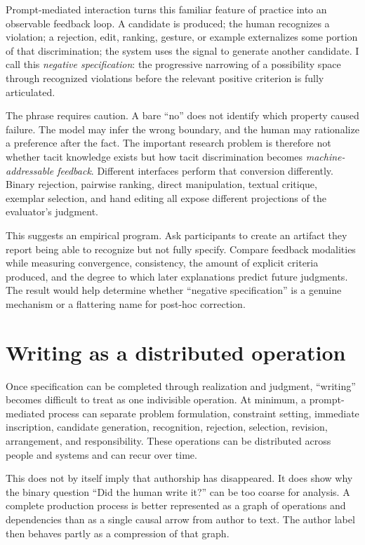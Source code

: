 \documentclass[11pt]{article}
\begin{document}
Prompt-mediated interaction turns this familiar feature of practice into an observable feedback loop. A candidate is produced; the human recognizes a violation; a rejection, edit, ranking, gesture, or example externalizes some portion of that discrimination; the system uses the signal to generate another candidate. I call this \emph{negative specification}: the progressive narrowing of a possibility space through recognized violations before the relevant positive criterion is fully articulated.

The phrase requires caution. A bare ``no'' does not identify which property caused failure. The model may infer the wrong boundary, and the human may rationalize a preference after the fact. The important research problem is therefore not whether tacit knowledge exists but how tacit discrimination becomes \emph{machine-addressable feedback}. Different interfaces perform that conversion differently. Binary rejection, pairwise ranking, direct manipulation, textual critique, exemplar selection, and hand editing all expose different projections of the evaluator's judgment.

This suggests an empirical program. Ask participants to create an artifact they report being able to recognize but not fully specify. Compare feedback modalities while measuring convergence, consistency, the amount of explicit criteria produced, and the degree to which later explanations predict future judgments. The result would help determine whether ``negative specification'' is a genuine mechanism or a flattering name for post-hoc correction.

\section{Writing as a distributed operation}

Once specification can be completed through realization and judgment, ``writing'' becomes difficult to treat as one indivisible operation. At minimum, a prompt-mediated process can separate problem formulation, constraint setting, immediate inscription, candidate generation, recognition, rejection, selection, revision, arrangement, and responsibility. These operations can be distributed across people and systems and can recur over time.

This does not by itself imply that authorship has disappeared. It does show why the binary question ``Did the human write it?'' can be too coarse for analysis. A complete production process is better represented as a graph of operations and dependencies than as a single causal arrow from author to text. The author label then behaves partly as a compression of that graph.
\end{document}
